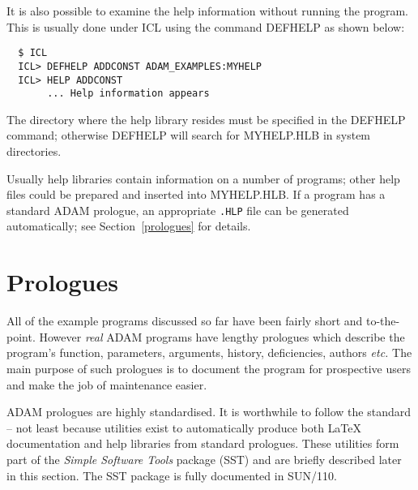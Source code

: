 \documentclass[twoside,11pt]{article}
\renewcommand{\_}{{\tt\char'137}}
\newcommand{\xref}[3]{#1}
\newcommand{\xlabel}[1]{}
\begin{document}
It is also possible to examine the help information without running the
program. This is usually done under ICL using the command DEFHELP as
shown below:
\begin{verbatim}
  $ ICL
  ICL> DEFHELP ADDCONST ADAM_EXAMPLES:MYHELP
  ICL> HELP ADDCONST
       ... Help information appears
\end{verbatim}
The directory where the help library resides must be specified in the
DEFHELP command; otherwise
DEFHELP will search for MYHELP.HLB in system directories.

Usually help libraries contain information on a number of programs;
other help files could be prepared and inserted into MYHELP.HLB.
If a program has a standard ADAM prologue,
an appropriate {\tt .HLP} file can be generated automatically; see
Section~\ref{prologues} for details.

\newpage
\section{Prologues\label{prologues}\xlabel{prologues}}

All of the example programs discussed so far have been fairly short and
to-the-point.
However {\sl real\/} ADAM programs have lengthy prologues which describe
the program's function, parameters, arguments, history, deficiencies, authors
{\it etc.}
The main purpose of such prologues is to document the program for
prospective users and make the job of maintenance easier.

ADAM prologues are highly standardised. It is worthwhile to follow the
standard --
not least because utilities exist to automatically produce
both {\LaTeX} documentation and help libraries from standard prologues.
These utilities form part
of the {\sl Simple Software Tools\/} package  (SST) and are briefly described
later in this section. The SST package is fully documented in
\xref{SUN/110}{sun110}{}.
\end{document}
